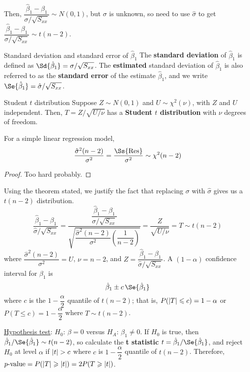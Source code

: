 Then, $ \dfrac{\hat{\beta}_1-\beta_1}{\sigma/\sqrt{S_{xx}}} \sim N(0,1) $,
but $ \sigma $ is unknown, so need to use $ \hat{\sigma} $
to get
$ \dfrac{\hat{\beta}_1-\beta_1}{\hat{\sigma}/\sqrt{S_{xx}}}
    \sim t(n-2) $.
\begin{Definition}{Standard deviation and standard error of $ \hat{\beta}_1 $}{}
    The \textbf{standard deviation} of $ \hat{\beta}_1 $
    is defined as $ \Sd{\hat{\beta}_1}=\sigma/\sqrt{S_{xx}} $.
    The \textbf{estimated} standard deviation of $ \hat{\beta}_1 $
    is also referred to as the \textbf{standard error}
    of the estimate $ \hat{\beta}_1 $, and
    we write $ \Se{\hat{\beta}_1}=\hat{\sigma}/\sqrt{S_{xx}} $.
\end{Definition}
\begin{Definition}{Student $ t $ distribution}{}
    Suppose $ Z \sim N(0,1) $ and $ U \sim \chi^2(\nu) $,
    with $ Z $ and $ U $ independent. Then,
    $ T=Z/\sqrt{U/\nu} $ has a \textbf{Student $t$ distribution}
    with $ \nu $ degrees of freedom.
\end{Definition}
\begin{Theorem}{}{}
    For a simple linear regression model,
    \[ \frac{\hat{\sigma}^2(n-2)}{\sigma^2}=\frac{\Ss{\text{Res}}}{\sigma^2}
        \sim \chi^2(n-2) \]
\end{Theorem}
\begin{proof}
    Too hard probably.
\end{proof}
Using the theorem stated, we justify
the fact that replacing $ \sigma $ with $ \hat{\sigma} $
gives us a $ t(n-2) $ distribution.
\[ \frac{\hat{\beta}_1-\beta_1}{\hat{\sigma}/\sqrt{S_{xx}}}
    =\dfrac{\dfrac{\hat{\beta}_1-\beta_1}{\sigma/\sqrt{S_{xx}}}}{
        \sqrt{\dfrac{\hat{\sigma}^2(n-2)}{\sigma^2}\left( \dfrac{1}{n-2} \right)}
    }=
    \frac{Z}{\sqrt{U/\nu}}=T \sim t(n-2)  \]
where $ \dfrac{\hat{\sigma}^2(n-2)}{\sigma^2}=U $,
$ \nu=n-2 $, and $ Z=\dfrac{\hat{\beta}_1-\beta_1}{\hat{\sigma}/\sqrt{S_{xx}}} $.
A $ (1-\alpha) $ confidence interval for $ \beta_1 $ is
\[ \hat{\beta}_1\pm c\,\Se{\hat{\beta}_1} \]
where $ c $ is the $ 1-\dfrac{\alpha}{2} $ quantile
of $ t(n-2) $; that is,
$ P(\lvert T\rvert\leqslant c)=1-\alpha $ or
$ P(T\leqslant c)=1-\dfrac{\alpha}{2} $
where $ T \sim t(n-2) $.

\underline{Hypothesis test}:
$ H_0 $: $ \beta=0 $ versus
$ H_A $: $ \beta_1\neq 0 $.
If $ H_0 $ is true, then $ \hat{\beta}_1/\Se{\hat{\beta}_1} \sim t(n-2) $,
so calculate the \textbf{t statistic}
$ t=\hat{\beta}_1/\Se{\hat{\beta}_1} $,
and reject $ H_0 $ at level $ \alpha $ if $ \lvert t\rvert>c $
where $ c $ is $ 1-\dfrac{\alpha}{2} $ quantile of $ t(n-2) $.
Therefore,
$ p\text{-value}=P(\lvert T\rvert\geqslant \lvert t\rvert)
    =2P(T\geqslant \lvert t\rvert) $.
